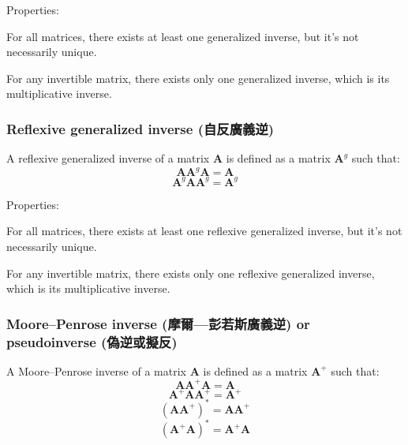 \documentclass[a4paper,12pt]{report}
\begin{document}
Properties:
\bit
\item For all matrices, there exists at least one generalized inverse, but it's not necessarily unique.
\item For any invertible matrix, there exists only one generalized inverse, which is its multiplicative inverse.
\eit
\subsubsection{Reflexive generalized inverse (自反廣義逆)}
A reflexive generalized inverse of a matrix $\mathbf{A}$ is defined as a matrix $\mathbf{A}^g$ such that:
\[\mathbf{A}\mathbf{A}^g\mathbf{A}=\mathbf{A}\]
\[\mathbf{A}^g\mathbf{A}\mathbf{A}^g=\mathbf{A}^g\]

Properties:
\bit
\item For all matrices, there exists at least one reflexive generalized inverse, but it's not necessarily unique.
\item For any invertible matrix, there exists only one reflexive generalized inverse, which is its multiplicative inverse.
\eit
\subsubsection{Moore–Penrose inverse (摩爾—彭若斯廣義逆) or pseudoinverse (偽逆或擬反)}
A Moore–Penrose inverse of a matrix $\mathbf{A}$ is defined as a matrix $\mathbf{A}^+$ such that:
\[\mathbf{A}\mathbf{A}^+\mathbf{A}=\mathbf{A}\]
\[\mathbf{A}^+\mathbf{A}\mathbf{A}^+=\mathbf{A}^+\]
\[\left(\mathbf{A}\mathbf{A}^{+}\right)^{*}=\mathbf{A}\mathbf{A}^{+}\]
\[\left(\mathbf{A}^+\mathbf{A}\right)^{*}=\mathbf{A}^+\mathbf{A}\]
\end{document}
